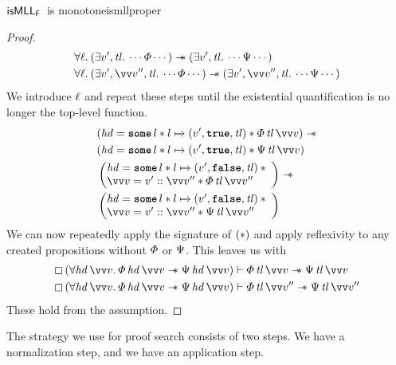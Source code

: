 \documentclass[thesis.tex]{subfiles}
\begin{document}
\begin{example}{$\textsf{\upshape isMLL}_{\textsf{\upshape F}}$\ is monotone}{ismllproper}
\begin{proof}
    \begin{align*}
       & \All \loc. (\Exists \val', \tl. \cdots \pred \cdots) \wand (\Exists \val', \tl. \cdots \predB \cdots)                               \\
       & \All \loc. (\Exists \val', \vect{\val}'', \tl. \cdots \pred \cdots) \wand (\Exists \val', \vect{\val}'', \tl. \cdots \predB \cdots)
    \end{align*}
    We introduce $\ell$ and repeat these steps until the existential quantification is no longer the top-level function.
    \begin{align*}
       & (\hd = \Some l * l \fmapsto (\val', \True, \tl) * \pred\, \tl\, \vect{\val}) \wand \\
       & (\hd = \Some l * l \fmapsto (\val', \True, \tl) * \predB\, \tl\, \vect{\val})      \\
       &
      \left(\begin{array}{@{}l}
                \hd = \Some l * l \fmapsto (\val', \False, \tl)\spac * \\
                \vect{\val} = \val' :: \vect{\val}'' * \pred\, \tl\, \vect{\val}''
              \end{array}\right)
      \wand                                                                                 \\
       & \left(\begin{array}{@{}l}
                   \hd = \Some l * l \fmapsto (\val', \False, \tl)\spac * \\
                   \vect{\val} = \val' :: \vect{\val}'' * \predB\, \tl\, \vect{\val}''
                 \end{array}\right)
    \end{align*}
    We can now repeatedly apply the signature of $(*)$ and apply reflexivity to any created propositions without $\varPhi$ or $\Psi$. This leaves us with
    \begin{align*}
      \always{(\All \hd\, \vect{v}. \pred\, \hd\, \vect{v} \wand \predB\, \hd\, \vect{v})} & \proves \pred\, \tl\, \vect{\val} \wand \predB\, \tl\, \vect{\val}     \\
      \always{(\All \hd\, \vect{v}. \pred\, \hd\, \vect{v} \wand \predB\, \hd\, \vect{v})} & \proves \pred\, \tl\, \vect{\val}'' \wand \predB\, \tl\, \vect{\val}''
    \end{align*}
    These hold from the assumption.
  \end{proof}
\end{example}
The strategy we use for proof search consists of two steps. We have a normalization step, and we have an application step.
\end{document}
